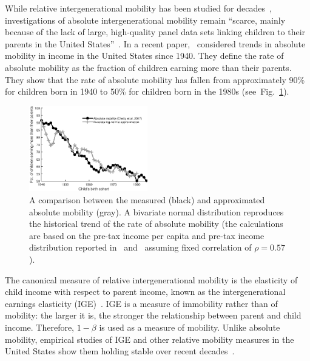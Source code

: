 \documentclass[final,10pt,5p,twocolumn,authoryear]{elsarticle}
\newcommand{\flabel}[1]{\label{fig:#1}}
\newcommand{\fref}[1]{Fig.~\ref{fig:#1}}
\numberwithin{equation}{section}
\begin{document}
While relative intergenerational mobility has been studied for decades~\citep{mazumder2005fortunate,aaronson2008intergenerational,lee2009trends,hauser2010intergenerational,corak2013income,chetty2014united,berman2016understanding}, investigations of absolute intergenerational mobility remain ``scarce, mainly because of the lack of large, high-quality panel data sets linking children to their parents in the United States''~\citep[p.~398]{chetty2017fading}. In a recent paper,~\citet{chetty2017fading} considered trends in absolute mobility in income in the United States since 1940. They define the rate of absolute mobility as the fraction of children earning more than their parents. They show that the rate of absolute mobility has fallen from approximately 90\% for children born in 1940 to 50\% for children born in the 1980s (see~\fref{trend}).

\begin{figure}[!htb]
\centering
\includegraphics[width=0.46\textwidth] {./figs/trend1.eps}
\caption{A comparison between the measured (black) and approximated absolute mobility (gray). A bivariate normal distribution reproduces the historical trend of the rate of absolute mobility (the calculations are based on the pre-tax income per capita and pre-tax income distribution reported in~\citet{PikettyZucman2014} and~\citet{WID2017} assuming fixed correlation of $\rho=0.57$).}
\flabel{trend}
\end{figure}

The canonical measure of relative intergenerational mobility is the elasticity of child income with respect to parent income, known as the intergenerational earnings elasticity (IGE)~\citep{mulligan1997parental,lee2009trends,chetty2014land}. IGE is a measure of immobility rather than of mobility: the larger it is, the stronger the relationship between parent and child income. Therefore, $1-\beta$ is used as a measure of mobility. Unlike absolute mobility, empirical studies of IGE and other relative mobility measures in the United States show them holding stable over recent decades~\citep{lee2009trends,hauser2010intergenerational,chetty2014land,chetty2014united}.
\end{document}
